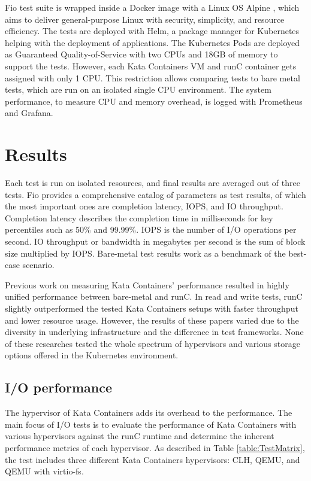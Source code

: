 Fio test suite is wrapped inside a Docker image with a Linux OS Alpine \cite{Alpine}, which aims to deliver general-purpose Linux with security, simplicity, and resource efficiency. The tests are deployed with Helm\cite{Helm}, a package manager for Kubernetes helping with the deployment of applications. The Kubernetes Pods are deployed as Guaranteed Quality-of-Service with two CPUs and 18GB of memory to support the tests. However, each Kata Containers VM and runC container gets assigned with only 1 CPU. This restriction allows comparing tests to bare metal tests, which are run on an isolated single CPU environment. The system performance, to measure CPU and memory overhead, is logged with Prometheus and Grafana.

\section{Results}

Each test is run on isolated resources, and final results are averaged out of three tests. Fio provides a comprehensive catalog of parameters as test results, of which the most important ones are completion latency, IOPS, and IO throughput. Completion latency describes the completion time in milliseconds for key percentiles such as 50\% and 99.99\%. IOPS is the number of I/O operations per second. IO throughput or bandwidth in megabytes per second is the sum of block size multiplied by IOPS. Bare-metal test results work as a benchmark of the best-case scenario.

Previous work \cite{EverartsdeVelp2020}\cite{Kumar2020}\cite{StackHPCKata}\cite{Randazzo2019} on measuring Kata Containers' performance resulted in highly unified performance between bare-metal and runC. In read and write tests, runC slightly outperformed the tested Kata Containers setups with faster throughput and lower resource usage. However, the results of these papers varied due to the diversity in underlying infrastructure and the difference in test frameworks. None of these researches tested the whole spectrum of hypervisors and various storage options offered in the Kubernetes environment.

\subsection{I/O performance}

The hypervisor of Kata Containers adds its overhead to the performance. The main focus of I/O tests is to evaluate the performance of Kata Containers with various hypervisors against the runC runtime and determine the inherent performance metrics of each hypervisor. As described in Table \ref{table:TestMatrix}, the test includes three different Kata Containers hypervisors: CLH, QEMU, and QEMU with virtio-fs.

